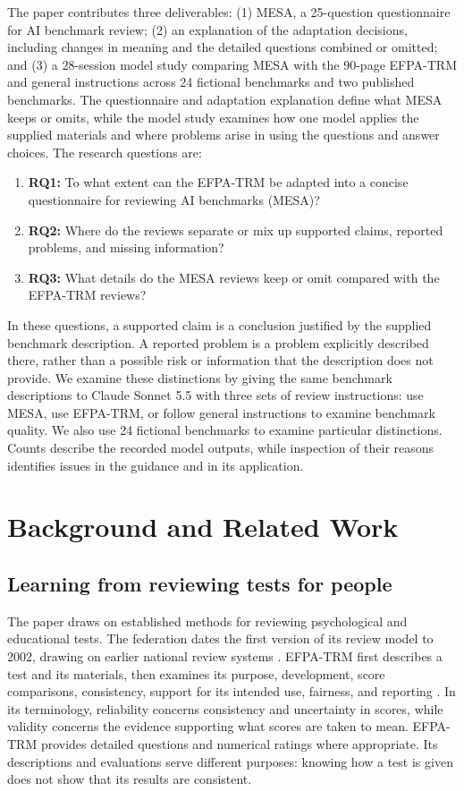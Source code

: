 \documentclass[10pt,conference]{IEEEtran}
\begin{document}
The paper contributes three deliverables: (1) MESA, a 25-question questionnaire for AI benchmark review; (2) an explanation of the adaptation decisions, including changes in meaning and the detailed questions combined or omitted; and (3) a 28-session model study comparing MESA with the 90-page EFPA-TRM and general instructions across 24 fictional benchmarks and two published benchmarks. The questionnaire and adaptation explanation define what MESA keeps or omits, while the model study examines how one model applies the supplied materials and where problems arise in using the questions and answer choices. The research questions are:
\begin{enumerate}
\item \textbf{RQ1:} To what extent can the EFPA-TRM be adapted into a concise questionnaire for reviewing AI benchmarks (MESA)?
\item \textbf{RQ2:} Where do the reviews separate or mix up supported claims, reported problems, and missing information?
\item \textbf{RQ3:} What details do the MESA reviews keep or omit compared with the EFPA-TRM reviews?
\end{enumerate}
In these questions, a supported claim is a conclusion justified by the supplied benchmark description. A reported problem is a problem explicitly described there, rather than a possible risk or information that the description does not provide. We examine these distinctions by giving the same benchmark descriptions to Claude Sonnet 5.5 with three sets of review instructions: use MESA, use EFPA-TRM, or follow general instructions to examine benchmark quality. We also use 24 fictional benchmarks to examine particular distinctions. Counts describe the recorded model outputs, while inspection of their reasons identifies issues in the guidance and in its application.

\section{Background and Related Work}
\subsection{Learning from reviewing tests for people}
The paper draws on established methods for reviewing psychological and educational tests. The federation dates the first version of its review model to 2002, drawing on earlier national review systems \cite{efpa_test_review_model_2025}. EFPA-TRM first describes a test and its materials, then examines its purpose, development, score comparisons, consistency, support for its intended use, fairness, and reporting \cite{efpa_test_review_model_2025}. In its terminology, reliability concerns consistency and uncertainty in scores, while validity concerns the evidence supporting what scores are taken to mean. EFPA-TRM provides detailed questions and numerical ratings where appropriate. Its descriptions and evaluations serve different purposes: knowing how a test is given does not show that its results are consistent.
\end{document}
